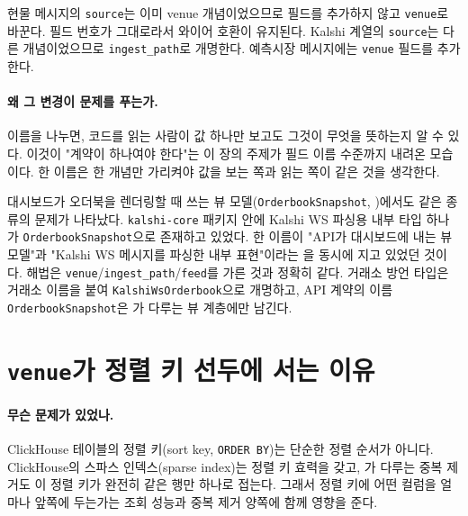현물 메시지의 \texttt{source}는 이미 venue 개념이었으므로 필드를 추가하지 않고
 \texttt{venue}로 바꾼다. 필드 번호가 그대로라서 와이어 호환이
유지된다. Kalshi 계열의 \texttt{source}는 다른 개념이었으므로 \texttt{ingest\_path}로
개명한다. 예측시장 메시지에는 \texttt{venue} 필드를  추가한다.

\paragraph{왜 그 변경이 문제를 푸는가.} 이름을 나누면, 코드를 읽는 사람이 값 하나만
보고도 그것이 무엇을 뜻하는지 알 수 있다. 이것이 "계약이 하나여야 한다"는 이 장의
주제가 필드 이름 수준까지 내려온 모습이다. 한 이름은 한 개념만 가리켜야 값을 보는
쪽과 읽는 쪽이 같은 것을 생각한다.

\begin{example}
\label{ex:contract-orderbooksnapshot}
대시보드가 오더북을 렌더링할 때 쓰는 뷰 모델(\texttt{OrderbookSnapshot},
)에서도 같은 종류의 문제가 나타났다. \texttt{kalshi-core}
패키지 안에 Kalshi WS 파싱용 내부 타입 하나가 
\texttt{OrderbookSnapshot}으로 존재하고 있었다. 한 이름이 "API가 대시보드에 내는
뷰 모델"과 "Kalshi WS 메시지를 파싱한 내부 표현"이라는 을 동시에 지고
있었던 것이다. 해법은 \texttt{venue}/\texttt{ingest\_path}/\texttt{feed}를 가른
것과 정확히 같다. 거래소 방언 타입은 거래소 이름을 붙여
\texttt{KalshiWsOrderbook}으로 개명하고, API 계약의 이름 \texttt{OrderbookSnapshot}은
가 다루는 뷰 계층에만 남긴다.
\end{example}

\section{\texttt{venue}가 정렬 키 선두에 서는 이유}
\label{sec:contract-sort-key}

\paragraph{무슨 문제가 있었나.} ClickHouse 테이블의 정렬 키(sort key, \texttt{ORDER
BY})는 단순한 정렬 순서가 아니다. ClickHouse의 스파스 인덱스(sparse index)는
정렬 키  효력을 갖고, 가 다루는 중복 제거도 이
정렬 키가 완전히 같은 행만 하나로 접는다. 그래서 정렬 키에 어떤 컬럼을 얼마나
앞쪽에 두는가는 조회 성능과 중복 제거 양쪽에 함께 영향을 준다.


